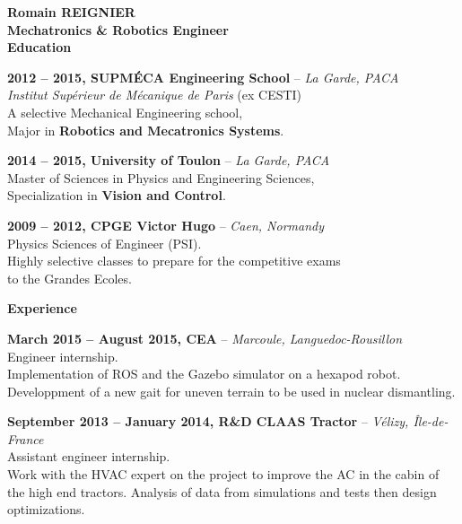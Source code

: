 \documentclass[a4paper,11pt,final]{memoir}
\newcommand{\Sep}{\vspace{1.5em}}
\newcommand{\SmallSep}{\vspace{0.5em}}
\newenvironment{AboutMe}
	{\ignorespaces%
}
	{\Sep\ignorespacesafterend}
\newcommand{\CVSection}[1]
	{\Large\textbf{#1}\par
	\SmallSep\normalsize\normalfont}
\newcommand{\CVItem}[2]
	{\textbf{\color{RoyalBlue} #1 \color{dark_gray} #2}\normalsize\normalfont}
\newcommand{\city}[1]
	{{\small\color{dark_gray}\emph{#1}}\normalsize\normalfont}
\begin{document}
\Huge\bfseries {\color{RoyalBlue} Romain REIGNIER} \\
\Large\bfseries Mechatronics \& Robotics Engineer\\

\CVSection{Education}
\CVItem{2012 -- 2015,}{SUPMÉCA Engineering School} -- \city{La Garde, PACA}\\
\emph{Institut Supérieur de Mécanique de Paris} (ex CESTI)\\
A selective Mechanical Engineering school,\\
Major in \textbf{Robotics and Mecatronics Systems}.
\SmallSep

\CVItem{2014 -- 2015,}{University of Toulon} -- \city{La Garde, PACA}\\
Master of Sciences in Physics and Engineering Sciences,\\
Specialization in \textbf{Vision and Control}.
\SmallSep

\CVItem{2009 -- 2012,}{CPGE Victor Hugo} -- \city{Caen, Normandy}\\
Physics Sciences of Engineer (PSI).\\
Highly selective classes to prepare for the competitive exams\\
to the Grandes Ecoles.
\Sep

\CVSection{Experience}
\CVItem{March 2015 -- August 2015,}{CEA} -- \city{Marcoule, Languedoc-Rousillon}\\
Engineer internship.\\
Implementation of ROS and the Gazebo simulator on a hexapod robot. Developpment of a new gait for uneven terrain to be used in nuclear dismantling.\SmallSep

\CVItem{September 2013 -- January 2014,}{R\&D CLAAS Tractor} -- \city{Vélizy, Île-de-France}\\
Assistant engineer internship.\\
Work with the HVAC expert on the project to improve the AC in the cabin of the high end tractors.
Analysis of data from simulations and tests then design optimizations.
\SmallSep
\end{document}
